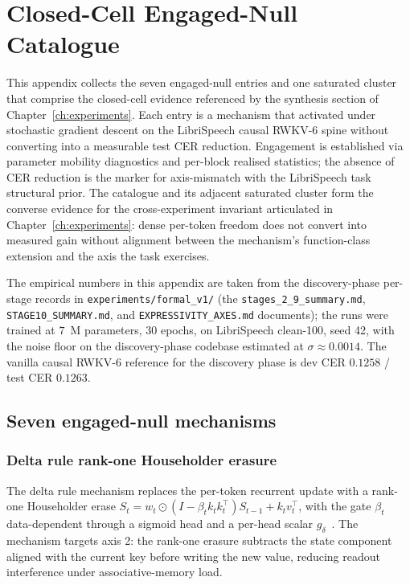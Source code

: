 \chapter{Closed-Cell Engaged-Null Catalogue}\label{app:engaged-null}

This appendix collects the seven engaged-null entries and one
saturated cluster that comprise the closed-cell evidence referenced
by the synthesis section of Chapter~\ref{ch:experiments}. Each entry
is a mechanism that activated under stochastic gradient descent on
the LibriSpeech causal RWKV-6 spine without converting into a
measurable test CER reduction. Engagement is established via
parameter mobility diagnostics and per-block realised statistics;
the absence of CER reduction is the marker for axis-mismatch with
the LibriSpeech task structural prior. The catalogue and its
adjacent saturated cluster form the converse evidence for the
cross-experiment invariant articulated in
Chapter~\ref{ch:experiments}: dense per-token freedom does not
convert into measured gain without alignment between the
mechanism's function-class extension and the axis the task
exercises.

The empirical numbers in this appendix are taken from the
discovery-phase per-stage records in
\texttt{experiments/formal\_v1/} (the
\texttt{stages\_2\_9\_summary.md},
\texttt{STAGE10\_SUMMARY.md}, and
\texttt{EXPRESSIVITY\_AXES.md} documents); the runs were trained at
$7$~M parameters, $30$ epochs, on LibriSpeech clean-100, seed 42,
with the noise floor on the discovery-phase codebase estimated at
$\sigma \approx 0.0014$. The vanilla causal RWKV-6 reference for
the discovery phase is dev CER $0.1258$ / test CER $0.1263$.

\section{Seven engaged-null mechanisms}\label{app:engaged-null:seven}

\subsection{Delta rule rank-one Householder erasure}\label{app:engaged-null:delta}

The delta rule mechanism replaces the per-token recurrent update with
a rank-one Householder erase
$S_{t} = w_{t} \odot (I - \beta_{t} k_{t} k_{t}^{\top}) S_{t-1} +
k_{t} v_{t}^{\top}$, with the gate $\beta_{t}$ data-dependent through
a sigmoid head and a per-head scalar
$g_{\delta}$~\cite{schlag2021deltanet, yang2024deltanet}. The
mechanism targets axis 2: the rank-one erasure subtracts the state
component aligned with the current key before writing the new value,
reducing readout interference under associative-memory load.

